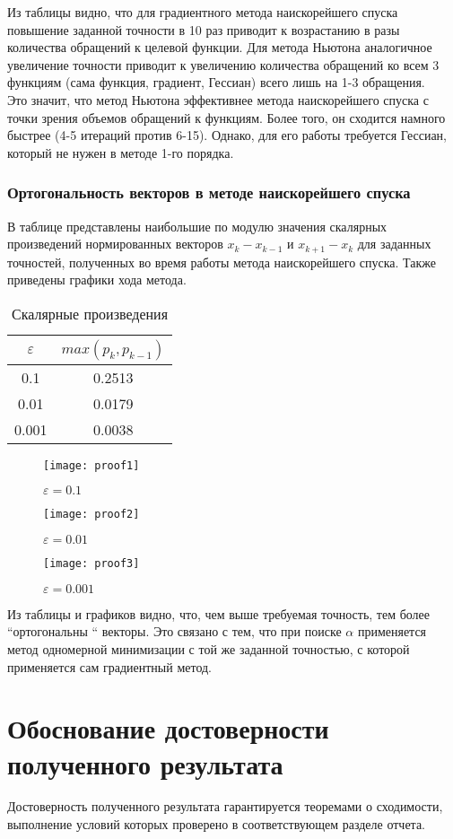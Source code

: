Из таблицы видно, что для градиентного метода наискорейшего спуска повышение заданной точности в 10 раз приводит к возрастанию в разы количества обращений к целевой функции. Для метода Ньютона аналогичное увеличение точности приводит к увеличению количества обращений ко всем 3 функциям (сама функция, градиент, Гессиан) всего лишь на 1-3 обращения.\\
Это значит, что метод Ньютона эффективнее метода наискорейшего спуска с точки зрения объемов обращений к функциям. Более того, он сходится намного быстрее (4-5 итераций против 6-15). Однако, для его работы требуется Гессиан, который не нужен в методе 1-го порядка.

\subsubsection{Ортогональность векторов в методе наискорейшего спуска}
В таблице представлены наибольшие по модулю значения скалярных произведений нормированных векторов $x_k-x_{k-1}$ и $x_{k+1}-x_k$ для заданных точностей, полученных во время работы метода наискорейшего спуска. Также приведены графики хода метода.

\begin{table}[h]
	\centering
		\begin{tabular} {|c|c|}
			\hline
			$\varepsilon$ & $max(p_k, p_{k-1})$\\ \hline
			0.1 & 0.2513\\ \hline
			0.01 & 0.0179 \\ \hline
			0.001 & 0.0038\\ \hline
		\end{tabular}
		\caption{Скалярные произведения}
	\end{table}

\begin{figure}[!htb]
    \centering
    \texttt{[image: proof1]}
    \caption{$\varepsilon=0.1$}
    \label{fig:proof1}
\end{figure}
\newpage
\begin{figure}[!htb]
    \centering
    \texttt{[image: proof2]}
    \caption{$\varepsilon=0.01$}
    \label{fig:proof2}
\end{figure}
\begin{figure}[!htb]
    \centering
    \texttt{[image: proof3]}
    \caption{$\varepsilon=0.001$}
    \label{fig:proof3}
\end{figure}

Из таблицы и графиков видно, что, чем выше требуемая точность, тем более ``ортогональны `` векторы. Это связано с тем, что при поиске $\alpha$ применяется метод одномерной минимизации с той же заданной точностью, с которой применяется сам градиентный метод.


\section{Обоснование достоверности полученного результата}
Достоверность полученного результата гарантируется теоремами о сходимости, выполнение условий которых проверено в соответствующем разделе отчета.



